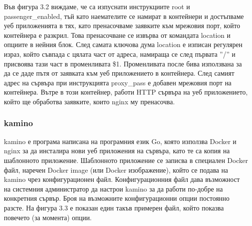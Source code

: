 \documentclass[pdftex,14pt,a4paper]{extreport}
\begin{document}
Във фигура 3.2 виждаме, че са изпуснати инструкциите root и passenger\_enabled, тъй като наемателите се намират в контейнери и достъпваме уеб приложенията в тях, като пренасочваме заявките към мрежовия порт, който контейнера е разкрил. Това пренасочване се извърва от командата location и опциите в нейния блок. След самата ключова дума location е изписан регулярен израз, който съвпада с цялата част от адреса, намираща се след първата ''/'' и присвоява тази част в променливата \$1. Променливата после бива използвана за да се даде пътя от заявката към уеб приложението в контейнера. След самият адрес на сървъра при инструкцията proxy\_pass е добавен мрежовия порт на контейнера. Вътре в този контейнер, работи HTTP сървъра на уеб приложението, който ще обработва заявките, които nginx му пренасочва.
\subsubsection {kamino}
kamino е програма написана на програмния език Go, която използва Docker и nginx за да инсталира нови уеб приложения на сървъра, като те са копия на шаблонното приложение. Шаблонното приложение се записва в специален Docker файл, наречен Docker image (или Docker изображение), който се подава на kamino чрез конфигурационен файл. Конфигурационния файл дава възможност на системния администратор да настрои kamino за да работи по-добре на конкретния сървър. Броя на възможните конфигурационни опции постоянно разсте. На фигура 3.3 е показан един такъв примерен файл, който показва повечето (за момента) опции. 
\paragraph {}
\end{document}
